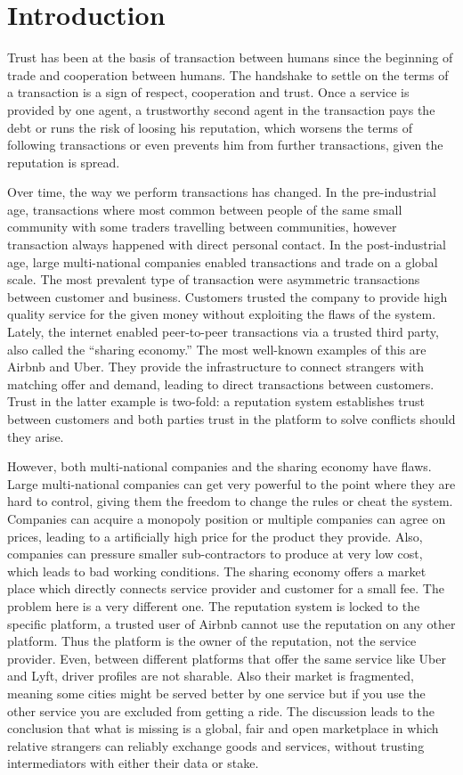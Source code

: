\chapter{Introduction}
Trust has been at the basis of transaction between humans since the beginning
of trade and cooperation between humans. The handshake to settle on the terms 
of a transaction is a sign of respect, cooperation and trust. Once a service is
provided by one agent, a trustworthy second agent in the transaction pays the debt 
or runs the risk of loosing his reputation, which worsens the terms of following 
transactions or even prevents him from further transactions, given the reputation 
is spread. 

Over time, the way we perform transactions has changed. In the pre-industrial age,
transactions where most common between people of the same small community with some traders
travelling between communities, however transaction always happened with direct 
personal contact. In the post-industrial age, large multi-national companies enabled transactions
and trade on a global scale. The most prevalent type of transaction were asymmetric transactions between
customer and business. Customers trusted the company to provide high quality service 
for the given money without exploiting the flaws of the system. Lately, the internet enabled
peer-to-peer transactions via a trusted third party, also called the ``sharing economy.''
The most well-known examples of this are Airbnb and Uber. They provide the infrastructure to connect strangers with 
matching offer and demand, leading to direct transactions between customers. Trust in the latter
example is two-fold: a reputation system establishes trust between customers and both
parties trust in the platform to solve conflicts should they arise.

However, both multi-national companies and the sharing economy have flaws. Large multi-national
companies can get very powerful to the point where they are hard to control, giving them
the freedom to change the rules or cheat the system. Companies can acquire a monopoly 
position or multiple companies can agree on prices, leading to a artificially high price
for the product they provide. Also, companies can pressure smaller sub-contractors to 
produce at very low cost, which leads to bad working conditions. The sharing economy offers
a market place which directly connects service provider and customer for a small fee. The
problem here is a very different one. The reputation system is locked to the specific platform, 
a trusted user of Airbnb cannot use the reputation on any other platform. Thus the platform 
is the owner of the reputation, not the service provider. Even, between different platforms
that offer the same service like Uber and Lyft, driver profiles are not sharable. Also their
market is fragmented, meaning some cities might be served better by one service but if you
use the other service you are excluded from getting a ride. The discussion leads to the 
conclusion that what is missing is a global, fair and open marketplace 
in which relative strangers can reliably exchange goods and services, without trusting 
intermediators with either their data or stake. 

